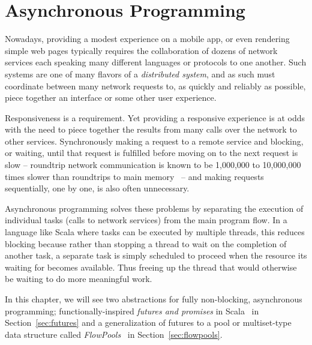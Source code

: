 \chapter{Asynchronous Programming}

Nowadays, providing a modest experience on a mobile app, or even rendering
simple web pages typically requires the collaboration of dozens of network
services each speaking many different languages or protocols to one another.
Such systems are one of many flavors of a {\em distributed system}, and as such
must coordinate between many network requests to, as quickly and reliably as
possible, piece together an interface or some other user experience.

Responsiveness is a requirement. Yet providing a responsive experience is at
odds with the need to piece together the results from many calls over the
network to other services. Synchronously making a request to a remote service
and blocking, or waiting, until that request is fulfilled before moving on to
the next request is slow -- roundtrip network communication is known to be
1,000,000 to 10,000,000 times slower than roundtrips to main
memory~\cite{Norvig2012} -- and making requests
sequentially, one by one, is also often unnecessary.

Asynchronous programming solves these problems by separating the execution of
individual tasks (\eg calls to network services) from the main program flow. In
a language like Scala where tasks can be executed by multiple threads, this
reduces blocking because rather than stopping a thread to wait on the completion
of another task, a separate task is simply scheduled to proceed when the
resource its waiting for becomes available. Thus freeing up the thread that
would otherwise be waiting to do more meaningful work.

In this chapter, we will see two abstractions for fully non-blocking,
asynchronous programming; functionally-inspired {\em futures and promises} in
Scala~\cite{Futures} in Section~\ref{sec:futures} and a generalization of
futures to a pool or multiset-type data structure called {\em
FlowPools}~\cite{FlowPools} in Section~\ref{sec:flowpools}.

